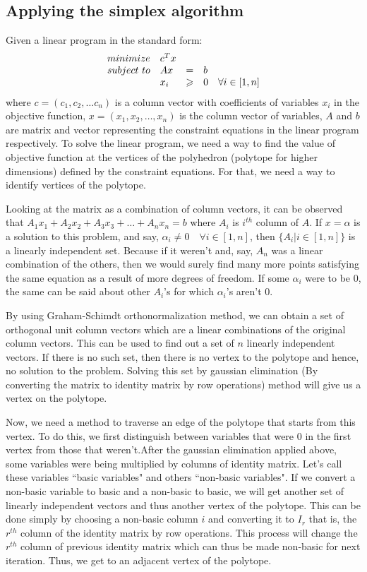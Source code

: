 \subsection{Applying the simplex algorithm}
Given a linear program in the standard form:
\[
\begin{array}{l l c l c l}
minimize & c^Tx & &  \\
subject \,\, to & Ax & = & b \\
& x_i & \geqslant & 0 \quad \forall i \in [1,n]
\end{array} 
\]
where $c = (c_1,c_2,\ldots c_n)$ is a column vector with coefficients of variables $x_i$ in the objective function, $x=(x_1,x_2,\ldots,x_n)$ is the column vector of variables, $A$ and $b$ are matrix and vector representing the constraint equations in the linear program respectively. To solve the linear program, we need a way to find the value of objective function at the vertices of the polyhedron (polytope for higher dimensions) defined by the constraint equations. For that, we need a way to identify vertices of the polytope.

Looking at the matrix as a combination of column vectors, it can be observed that $A_1x_1 + A_2x_2 + A_3x_3 + \ldots + A_nx_n = b$ where $A_i$ is $i^{th}$ column of $A$. If $x=\alpha$ is a solution to this problem, and say, $\alpha_i \neq 0 \quad \forall i \in [1,n]$, then $\{A_i | i \in [1,n]\}$ is a linearly independent set. Because if it weren't and, say, $A_n$ was a linear combination of the others, then we would surely find many more points satisfying the same equation as a result of more degrees of freedom. If some $\alpha_i$ were to be 0, the same can be said about other $A_i$'s for which $\alpha_i$'s aren't 0.

By using Graham-Schimdt orthonormalization method, we can obtain a set of orthogonal unit column vectors which are a linear combinations of the original column vectors. This can be used to find out a set of $n$ linearly independent vectors. If there is no such set, then there is no vertex to the polytope and hence, no solution to the problem. Solving this set by gaussian elimination (By converting the matrix to identity matrix by row operations) method will give us a vertex on the polytope.

Now, we need a method to traverse an edge of the polytope that starts from this vertex. To do this, we first distinguish between variables that were 0 in the first vertex from those that weren't.After the gaussian elimination applied above, some variables were being multiplied by columns of identity matrix. Let's call these variables ``basic variables" and others ``non-basic variables". If we convert a non-basic variable to basic and a non-basic to basic, we will get another set of linearly independent vectors and thus another vertex of the polytope. This can be done simply by choosing a non-basic column $i$ and converting it to $I_r$ that is, the $r^{th}$ column of the identity matrix by row operations. This process will change the $r^{th}$ column of previous identity matrix which can thus be made non-basic for next iteration. Thus, we get to an adjacent vertex of the polytope.

